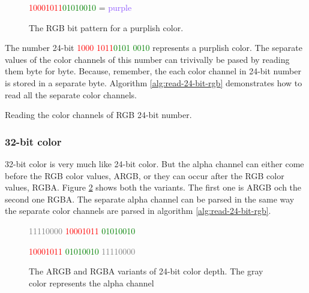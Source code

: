 \begin{figure}
  \centering
  {\huge\textcolor{red}{10001011}\textcolor{green}{01010010}\textcolor{blue}{\fullbyte}
    = \textcolor[HTML]{8B52FF}{purple}}
  \caption{The RGB bit pattern for a purplish color.}
  \label{fig:24-bit-colors-bits}
\end{figure}

The number 24-bit \textcolor{red}{1000 1011}\textcolor{green}{0101
  0010}\textcolor{blue}{\fullbyte} represents a purplish color. The
separate values of the color channels of this number can trivivally
be pased by reading them byte for byte. Because, remember, the each
color channel in 24-bit number is stored in a separate
byte. Algorithm \ref{alg:read-24-bit-rgb} demonstrates how to read
all the separate color channels.


\begin{algorithm}[H]
  \caption{Reading the color channels of RGB 24-bit number.}
  \label{alg:read-24-bit-rgb}
  \begin{algorithmic}[1]
  \end{algorithmic}
\end{algorithm}

\subsubsection{32-bit color}

32-bit color is very much like 24-bit color. But the alpha channel
can either come before the RGB color values, ARGB, or
they can occur after the RGB color values, RGBA. Figure
\ref{fig:32-bit-colors-bits} shows both the variants. The first one
is ARGB och the second one RGBA. The separate alpha channel can be
parsed in the same way the separate color channels are parsed in
algorithm \ref{alg:read-24-bit-rgb}.

\begin{figure}
  \centering
  {\Large%
    \textcolor{gray}{11110000}%
    \textcolor{red}{10001011}%
    \textcolor{green}{01010010}%
    \textcolor{blue}{\fullbyte}

    \textcolor{red}{10001011}%
    \textcolor{green}{01010010}%
    \textcolor{blue}{\fullbyte}%
    \textcolor{gray}{11110000}%
  }

  \caption{The ARGB and RGBA variants of 24-bit color depth. The
    gray color represents the alpha channel }
  \label{fig:32-bit-colors-bits}
\end{figure}

